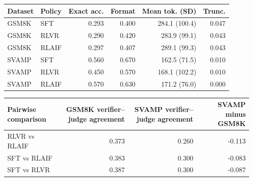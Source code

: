 \documentclass{article}
\begin{document}
\begin{center}
\label{tab:task5-metrics}
\small
\setlength{\tabcolsep}{4pt}
\begin{tabular}{llrrrr}
\toprule
Dataset & Policy & Exact acc. & Format & Mean tok. (SD) & Trunc. \\
\midrule
GSM8K & SFT
& 0.293 & 0.400 & 284.1 (100.4) & 0.047 \\

GSM8K & RLVR
& 0.290 & 0.420 & 283.9 (99.1) & 0.043 \\

GSM8K & RLAIF
& 0.297 & 0.407 & 289.1 (99.3) & 0.043 \\

SVAMP & SFT
& 0.560 & 0.670 & 162.5 (71.5) & 0.010 \\

SVAMP & RLVR
& 0.450 & 0.570 & 168.1 (102.2) & 0.010 \\

SVAMP & RLAIF
& 0.570 & 0.630 & 171.2 (76.0) & 0.000 \\
\bottomrule
\end{tabular}
\end{center}




\begin{center}
\label{tab:task5-agreement-transfer}
\small
\setlength{\tabcolsep}{4pt}
\begin{tabular}{lrrr}
\toprule
Pairwise comparison
& GSM8K verifier--judge agreement
& SVAMP verifier--judge agreement
& SVAMP minus GSM8K \\
\midrule
RLVR vs RLAIF
& 0.373 & 0.260 & -0.113 \\

SFT vs RLAIF
& 0.383 & 0.300 & -0.083 \\

SFT vs RLVR
& 0.387 & 0.300 & -0.087 \\
\bottomrule
\end{tabular}
\end{center}

%
\end{document}
